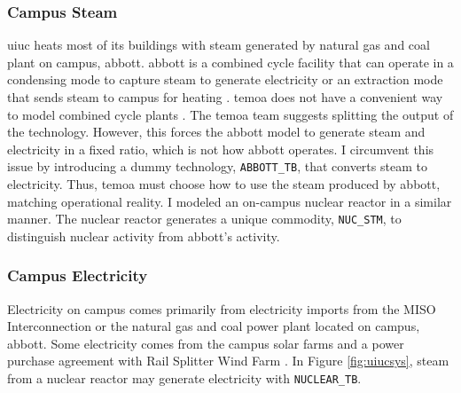 \subsubsection{Campus Steam}
\gls{uiuc} heats most of its buildings with steam generated by natural gas and
coal plant on campus, \gls{abbott}. \gls{abbott} is a combined cycle facility that
can operate in a condensing mode to capture steam to generate electricity or an
extraction mode that sends steam to campus for heating
\cite{affiliated_engineers_inc_utilities_2015}. \gls{temoa} does not have a
convenient way to model combined cycle plants \cite{decarolis_temoa_2010}. The
\gls{temoa} team suggests splitting the output of the technology. However, this
forces the \gls{abbott} model to generate steam and electricity in a fixed ratio, which
is not how \gls{abbott} operates. I circumvent this issue by introducing a dummy
technology, \texttt{ABBOTT\_TB}, that converts steam to electricity. Thus, \gls{temoa}
must choose how to use the steam produced by \gls{abbott}, matching operational reality.
I modeled an on-campus nuclear reactor in a similar manner. The nuclear reactor
generates a unique commodity, \texttt{NUC\_STM}, to distinguish nuclear activity
from \gls{abbott}'s activity.


\subsubsection{Campus Electricity}

Electricity on campus comes primarily from electricity imports from the MISO
Interconnection or the natural gas and coal power plant located on campus,
\gls{abbott}. Some electricity comes from the campus solar farms and a power purchase
agreement with Rail Splitter Wind Farm
\cite{institute_for_sustainability_energy_and_environment_illinois_2015,breitweiser_wind_2016,white_solar_2017}.
In Figure \ref{fig:uiucsys}, steam from a nuclear reactor may generate
electricity with \texttt{NUCLEAR\_TB}.


